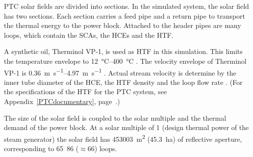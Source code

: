 PTC solar fields are divided into sections. In the simulated system, the solar field has two sections. Each section carries a feed pipe and a return pipe to transport the thermal energy to the power block. Attached to the header pipes are many loops, which contain the SCAs, the HCEs and the HTF. 

A synthetic oil, Therminol VP-1, is used as HTF in this simulation. This limits the temperature envelope to \SIrange{12}{400}{\celsius} \cite{Therminol2015}. The velocity envelope of Therminol VP-1 is \SIrange{0.36}{4.97}{\meter\per\second} \cite{Wagner2014}. Actual stream velocity is determine by the inner tube diameter of the HCE, the HTF density and the loop flow rate \cite{NREL2015a}. (For the specifications of the HTF for the PTC system, see Appendix~\ref{PTCdocumentary}, page~\pageref{PTC_HTF}.) 

The size of the solar field is coupled to the solar multiple and the thermal demand of the power block. At a solar multiple of \si{1} (design thermal power of the steam generator) the solar field has \SI{453003}{\square\metre} (\SI{45.3}{\hectare}) of reflective aperture, corresponding to \si{65.86} ($\approx$66) loops.



